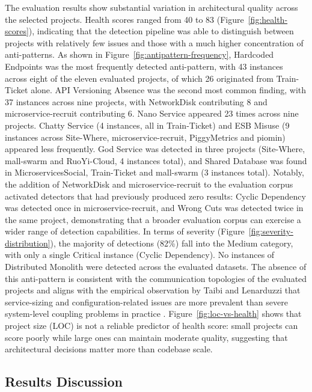 \par The evaluation results show substantial variation in architectural quality across the selected projects. Health scores ranged from 40 to 83 (Figure~\ref{fig:health-scores}), indicating that the detection pipeline was able to distinguish between projects with relatively few issues and those with a much higher concentration of anti-patterns. As shown in Figure~\ref{fig:antipattern-frequency}, Hardcoded Endpoints was the most frequently detected anti-pattern, with 43 instances across eight of the eleven evaluated projects, of which 26 originated from Train-Ticket alone. API Versioning Absence was the second most common finding, with 37 instances across nine projects, with NetworkDisk contributing 8 and microservice-recruit contributing 6. Nano Service appeared 23 times across nine projects. Chatty Service (4 instances, all in Train-Ticket) and ESB Misuse (9 instances across Site-Where, microservice-recruit, PiggyMetrics and piomin) appeared less frequently. God Service was detected in three projects (Site-Where, mall-swarm and RuoYi-Cloud, 4 instances total), and Shared Database was found in MicroservicesSocial, Train-Ticket and mall-swarm (3 instances total). Notably, the addition of NetworkDisk and microservice-recruit to the evaluation corpus activated detectors that had previously produced zero results: Cyclic Dependency was detected once in microservice-recruit, and Wrong Cuts was detected twice in the same project, demonstrating that a broader evaluation corpus can exercise a wider range of detection capabilities. In terms of severity (Figure~\ref{fig:severity-distribution}), the majority of detections (82\%) fall into the Medium category, with only a single Critical instance (Cyclic Dependency). No instances of Distributed Monolith were detected across the evaluated datasets. The absence of this anti-pattern is consistent with the communication topologies of the evaluated projects and aligns with the empirical observation by Taibi and Lenarduzzi that service-sizing and configuration-related issues are more prevalent than severe system-level coupling problems in practice \cite{Taibi2018}. Figure~\ref{fig:loc-vs-health} shows that project size (LOC) is not a reliable predictor of health score: small projects can score poorly while large ones can maintain moderate quality, suggesting that architectural decisions matter more than codebase scale.

\subsection{Results Discussion}
\label{subsec:discussion-results}

